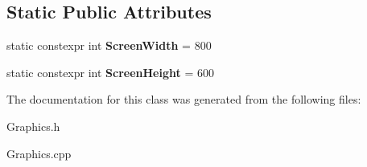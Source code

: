 \subsection*{Static Public Attributes}
\begin{DoxyCompactItemize}
\item 
\mbox{\label{class_graphics_ad9975c4111f24684740c6fedc3dc9659}} 
static constexpr int {\bfseries Screen\+Width} = 800
\item 
\mbox{\label{class_graphics_a315cf431c3f771beed8da6ce04955c9d}} 
static constexpr int {\bfseries Screen\+Height} = 600
\end{DoxyCompactItemize}


The documentation for this class was generated from the following files\+:\begin{DoxyCompactItemize}
\item 
Graphics.\+h\item 
Graphics.\+cpp\end{DoxyCompactItemize}

